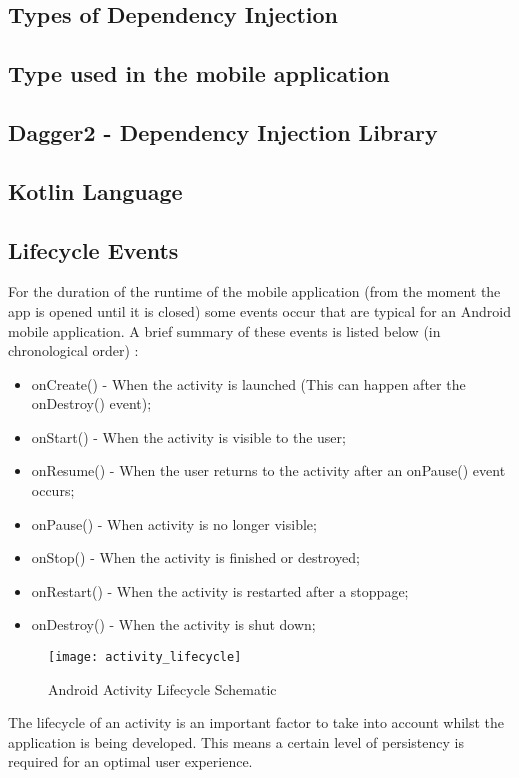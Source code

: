 \subsection{Types of Dependency Injection}
\subsection{Type used in the mobile application}
\subsection{Dagger2 - Dependency Injection Library}
\subsection{Kotlin Language}
\subsection{Lifecycle Events}
For the duration of the runtime of the mobile application (from the moment the app is opened until it is closed) some events occur that are typical for an Android mobile application. A brief summary of these events is listed below (in chronological order) \cite{AndroidDeveloper2019}:
\begin{itemize}
\item onCreate() - When the activity is launched (This can happen after the onDestroy() event);
\item onStart() - When the activity is visible to the user;
\item onResume() - When the user returns to the activity after an onPause() event occurs;
\item onPause() - When activity is no longer visible;
\item onStop() - When the activity is finished or destroyed;
\item onRestart() - When the activity is restarted after a stoppage;
\item onDestroy() - When the activity is shut down;
\end{itemize}
\begin{figure}
\centering
\texttt{[image: activity\_lifecycle]}
\caption{Android Activity Lifecycle Schematic~\cite{AndroidDeveloper2019}}
\end{figure}
The lifecycle of an activity is an important factor to take into account whilst the application is being developed. This means a certain level of persistency is required for an optimal user experience.
